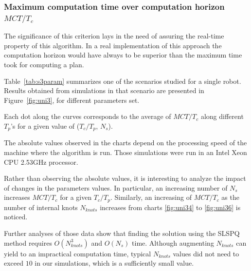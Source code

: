 \subsubsection{Maximum computation time over computation horizon $MCT/T_c$}

The significance of this criterion lays in the need of assuring the 
real-time property of this algorithm.
In a real implementation of this approach the computation horizon would have 
always to be superior than the
maximum time took for computing a plan.


Table~\ref{tab:s3param} summarizes one of the scenarios studied for a 
single robot. Results obtained from simulations in 
that scenario are presented in Figure~\ref{fig:uni3}, for different parameters set.

Each dot along the curves corresponds to the average of $MCT/T_c$ along different $T_p$'s for a given value of ($T_c/T_p$, $N_s$).

The absolute values observed in the charts depend on the processing speed of the machine
where the algorithm is run. Those simulations were run in an Intel Xeon CPU 2.53GHz processor.

Rather than observing the absolute values, it is interesting to analyze the impact of 
changes in the parameters values. In particular, an increasing number of $N_s$ 
increases $MCT/T_c$ for a 
given $T_c/T_p$. Similarly, an increasing of $MCT/T_c$ as the number of
internal knots $N_{knots}$ increases from charts \ref{fig:uni34} to \ref{fig:uni36} is 
noticed.

Further analyses of those data show that finding the solution using the SLSPQ method
requires $O(N_{knots}^3)$ and $O(N_s)$ time. Although augmenting $N_{knots}$ can yield
to an impractical computation time, typical $N_{knots}$ values did not need to exceed $10$ in our simulations, which is a sufficiently small value.

